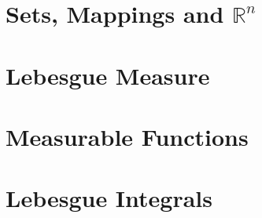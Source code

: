 \documentclass{report}
\begin{document}
	
	\thispagestyle{empty}
	\newpage%
	\tableofcontents
  
  \chapter{Sets, Mappings and $\mathbb{R}^n$}
  
  \chapter{Lebesgue Measure}
  
  \chapter{Measurable Functions}
  
  \chapter{Lebesgue Integrals}
  
  
\end{document}
